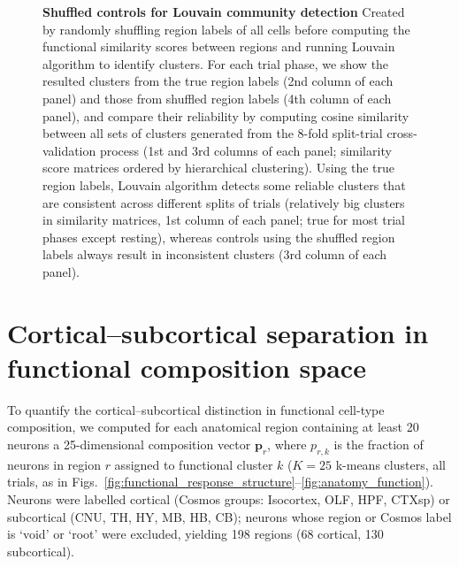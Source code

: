 \begin{figure}
\begin{fullwidth}
\caption{\textbf{Shuffled controls for Louvain community detection}
Created by randomly shuffling region labels of all cells before computing the functional similarity scores between regions and running Louvain algorithm to identify clusters. For each trial phase, we show the resulted clusters from the true region labels (2nd column of each panel) and those from shuffled region labels (4th column of each panel), and compare their reliability by computing cosine similarity between all sets of clusters generated from the 8-fold split-trial cross-validation process (1st and 3rd columns of each panel; similarity score matrices ordered by hierarchical clustering). Using the true region labels, Louvain algorithm detects some reliable clusters that are consistent across different splits of trials (relatively big clusters in similarity matrices, 1st column of each panel; true for most trial phases except resting), whereas controls using the shuffled region labels always result in inconsistent clusters (3rd column of each panel). 
\label{fig:network_stability}
}
\end{fullwidth}
\end{figure}

\fi

\section*{Cortical--subcortical separation in functional composition space}

  To quantify the cortical--subcortical distinction in functional cell-type
  composition, we computed for each anatomical region containing at least 20 neurons
  a 25-dimensional composition vector $\mathbf{p}_r$, where $p_{r,k}$ is the
  fraction of neurons in region $r$ assigned to functional cluster $k$
  ($K = 25$ k-means clusters, all trials, as in Figs.~\ref{fig:functional_response_structure}--\ref{fig:anatomy_function}).
  Neurons were labelled cortical (Cosmos groups: Isocortex, OLF, HPF, CTXsp)
  or subcortical (CNU, TH, HY, MB, HB, CB); neurons whose region or Cosmos label
  is `void' or `root' were excluded, yielding 198 regions (68 cortical, 130 subcortical).

